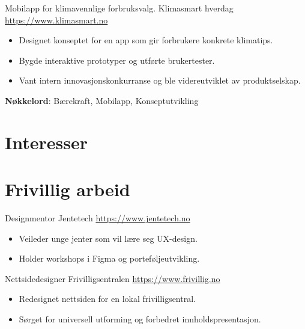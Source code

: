 \documentclass[a4paper, serif, 10pt]{moderncv}
\begin{document}
        {Mobilapp for klimavennlige forbruksvalg.}
        {Klimasmart hverdag}
        {\url{https://www.klimasmart.no}}
        {}
        {\begin{itemize}
\item Designet konseptet for en app som gir forbrukere konkrete klimatips.
\item Bygde interaktive prototyper og utførte brukertester.
\item Vant intern innovasjonskonkurranse og ble videreutviklet av produktselskap.
\end{itemize}
\textbf{Nøkkelord}: Bærekraft, Mobilapp, Konseptutvikling}
\section{Interesser}

\section{Frivillig arbeid}

        {Designmentor}
        {Jentetech}
        {\url{https://www.jentetech.no}}
        {}
        {\begin{itemize}
\item Veileder unge jenter som vil lære seg UX-design.
\item Holder workshops i Figma og porteføljeutvikling.
\end{itemize}}
    

        {Nettsidedesigner}
        {Frivilligsentralen}
        {\url{https://www.frivillig.no}}
        {}
        {\begin{itemize}
\item Redesignet nettsiden for en lokal frivilligsentral.
\item Sørget for universell utforming og forbedret innholdspresentasjon.
\end{itemize}}
    
\end{document}
